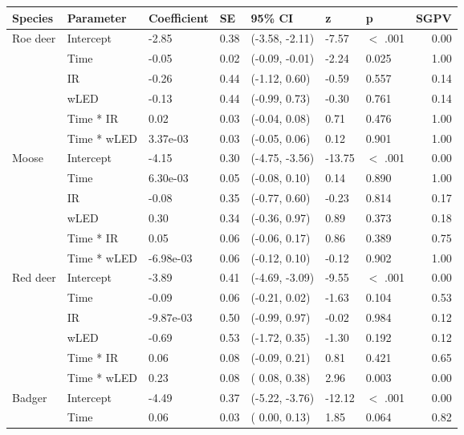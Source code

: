 \begin{table}[ht]
\centering
\begin{tabular}{lllllllr}
  \hline
Species & Parameter & Coefficient & SE & 95\% CI & z & p & SGPV \\ 
  \hline
Roe deer & Intercept & -2.85 & 0.38 & (-3.58, -2.11) & -7.57 & $<$ .001 & 0.00 \\ 
   & Time & -0.05 & 0.02 & (-0.09, -0.01) & -2.24 & 0.025  & 1.00 \\ 
   & IR & -0.26 & 0.44 & (-1.12,  0.60) & -0.59 & 0.557  & 0.14 \\ 
   & wLED & -0.13 & 0.44 & (-0.99,  0.73) & -0.30 & 0.761  & 0.14 \\ 
   & Time * IR & 0.02 & 0.03 & (-0.04,  0.08) & 0.71 & 0.476  & 1.00 \\ 
   & Time * wLED & 3.37e-03 & 0.03 & (-0.05,  0.06) & 0.12 & 0.901  & 1.00 \\ 
  Moose & Intercept & -4.15 & 0.30 & (-4.75, -3.56) & -13.75 & $<$ .001 & 0.00 \\ 
   & Time & 6.30e-03 & 0.05 & (-0.08,  0.10) & 0.14 & 0.890  & 1.00 \\ 
   & IR & -0.08 & 0.35 & (-0.77,  0.60) & -0.23 & 0.814  & 0.17 \\ 
   & wLED & 0.30 & 0.34 & (-0.36,  0.97) & 0.89 & 0.373  & 0.18 \\ 
   & Time * IR & 0.05 & 0.06 & (-0.06,  0.17) & 0.86 & 0.389  & 0.75 \\ 
   & Time * wLED & -6.98e-03 & 0.06 & (-0.12,  0.10) & -0.12 & 0.902  & 1.00 \\ 
  Red deer & Intercept & -3.89 & 0.41 & (-4.69, -3.09) & -9.55 & $<$ .001 & 0.00 \\ 
   & Time & -0.09 & 0.06 & (-0.21,  0.02) & -1.63 & 0.104  & 0.53 \\ 
   & IR & -9.87e-03 & 0.50 & (-0.99,  0.97) & -0.02 & 0.984  & 0.12 \\ 
   & wLED & -0.69 & 0.53 & (-1.72,  0.35) & -1.30 & 0.192  & 0.12 \\ 
   & Time * IR & 0.06 & 0.08 & (-0.09,  0.21) & 0.81 & 0.421  & 0.65 \\ 
   & Time * wLED & 0.23 & 0.08 & ( 0.08,  0.38) & 2.96 & 0.003  & 0.00 \\ 
  Badger & Intercept & -4.49 & 0.37 & (-5.22, -3.76) & -12.12 & $<$ .001 & 0.00 \\ 
   & Time & 0.06 & 0.03 & ( 0.00,  0.13) & 1.85 & 0.064  & 0.82 \\ 

\end{tabular}
\end{table}
